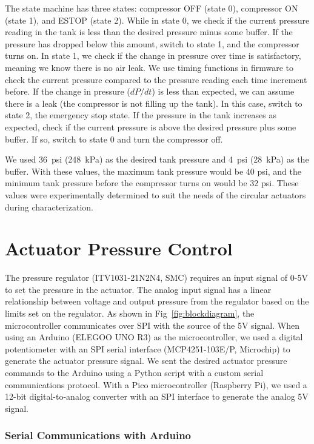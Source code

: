 The state machine has three states: compressor OFF (state 0), compressor ON (state 1), and ESTOP (state 2). While in state 0, we check if the current pressure reading in the tank is less than the desired pressure minus some buffer. If the pressure has dropped below this amount, switch to state 1, and the compressor turns on. In state 1, we check if the change in pressure over time is satisfactory, meaning we know there is no air leak. We use timing functions in firmware to check the current pressure compared to the pressure reading each time increment before. If the change in pressure ($dP/dt$) is less than expected, we can assume there is a leak (the compressor is not filling up the tank). In this case, switch to state 2, the emergency stop state. If the pressure in the tank increases as expected, check if the current pressure is above the desired pressure plus some buffer. If so, switch to state 0 and turn the compressor off. 

We used 36~psi (248~kPa) as the desired tank pressure and 4~psi (28~kPa) as the buffer. With these values, the maximum tank pressure would be 40 psi, and the minimum tank pressure before the compressor turns on would be 32 psi. These values were experimentally determined to suit the needs of the circular actuators during characterization. 

\clearpage
\section{Actuator Pressure Control}

The pressure regulator (ITV1031-21N2N4, SMC) requires an input signal of 0-5V to set the pressure in the actuator. The analog input signal has a linear relationship between voltage and output pressure from the regulator based on the limits set on the regulator. As shown in Fig~\ref{fig:blockdiagram}, the microcontroller communicates over SPI with the source of the 5V signal. When using an Arduino (ELEGOO UNO R3) as the microcontroller, we used a digital potentiometer with an SPI serial interface (MCP4251-103E/P, Microchip) to generate the actuator pressure signal. We sent the desired actuator pressure commands to the Arduino using a Python script with a custom serial communications protocol. With a Pico microcontroller (Raspberry Pi), we used a 12-bit digital-to-analog converter with an SPI interface to generate the analog 5V signal. 

\subsubsection{Serial Communications with Arduino}

